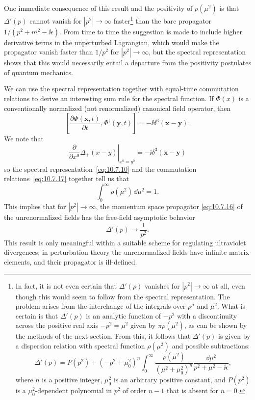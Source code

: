 One immediate consequence of this result and the positivity of $\rho(\mu^2)$
is that $\Delta'(p)$ cannot vanish for $|p^2|\to\infty$ faster\footnote{In fact,
it is not even certain that $\Delta'(p)$ vanishes for $|p^2|\to\infty$ at all,
even though this would seem to follow from the spectral representation. The
problem arises from the interchange of the integrals over $p^\mu$ and $\mu^2$.
What is certain is that $\Delta'(p)$ is an analytic function of $-p^2$ with a
discontinuity across the positive real axis $-p^2=\mu^2$ given by
$\pi\rho(\mu^2)$, as can be shown by the methods of the next section. From
this, it follows that $\Delta'(p)$ is given by a dispersion relation with
spectral function $\rho(\mu^2)$ and possible subtractions:
\[
  \Delta'(p)=P(p^2)+(-p^2+\mu_0^2)^n\int_0^\infty
  \frac{\rho(\mu^2)}{(\mu^2+\mu_0^2)^n}
  \frac{\dd\mu^2}{p^2+\mu^2-\ii\epsilon},
\]
where $n$ is a positive integer, $\mu_0^2$ is an arbitrary positive constant,
and $P(p^2)$ is a $\mu_0^2$-dependent polynomial in $p^2$ of order $n-1$
that is absent for $n=0$.} than the bare propagator
$1/(p^2+m^2-\ii\epsilon)$. From time to time the suggestion is made to
include higher derivative terms in the unperturbed Lagrangian, which would
make the propagator vanish faster than $1/p^2$ for $|p^2|\to\infty$, but the
spectral representation shows that this would necessarily entail a departure
from the positivity postulates of quantum mechanics.

We can use the spectral representation together with equal-time commutation
relations to derive an interesting sum rule for the spectral function. If
$\Phi(x)$ is a conventionally normalized (not renormalized) canonical field
operator, then
\begin{equation}
  \left[\frac{\partial\Phi(\mathbf{x},t)}{\partial t},
  \Phi^\dagger(\mathbf{y},t)\right]=-\ii\delta^3(\mathbf{x}-\mathbf{y}).
  \tag{10.7.17}\label{eq:10.7.17}
\end{equation}
We note that
\begin{equation*}
  \left.\frac{\partial}{\partial x^0}\Delta_+(x-y)\right|_{x^0=y^0}
  =-\ii\delta^3(\mathbf{x}-\mathbf{y})
\end{equation*}
so the spectral representation~\eqref{eq:10.7.10} and the commutation
relations~\eqref{eq:10.7.17} together tell us that
\begin{equation}
  \int_0^\infty\rho(\mu^2)\,\dd\mu^2=1.
  \tag{10.7.18}\label{eq:10.7.18}
\end{equation}
This implies that for $|p^2|\to\infty$, the momentum space propagator
\eqref{eq:10.7.16} of the unrenormalized fields has the free-field asymptotic
behavior
\begin{equation*}
  \Delta'(p)\longrightarrow\frac{1}{p^2}.
\end{equation*}
This result is only meaningful within a suitable scheme for regulating
ultraviolet divergences; in perturbation theory the unrenormalized fields
have infinite matrix elements, and their propagator is ill-defined.

